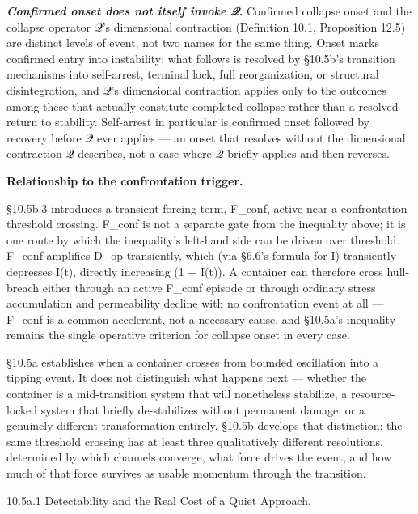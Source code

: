 \documentclass[
]{article}
\begin{document}
\emph{\textbf{Confirmed onset does not itself invoke 𝒬.}} Confirmed
collapse onset and the collapse operator 𝒬's dimensional contraction
(Definition 10.1, Proposition 12.5) are distinct levels of event, not
two names for the same thing. Onset marks confirmed entry into
instability; what follows is resolved by §10.5b's transition mechanisms
into self-arrest, terminal lock, full reorganization, or structural
disintegration, and 𝒬's dimensional contraction applies only to the
outcomes among these that actually constitute completed collapse rather
than a resolved return to stability. Self-arrest in particular is
confirmed onset followed by recovery before 𝒬 ever applies --- an onset
that resolves without the dimensional contraction 𝒬 describes, not a
case where 𝒬 briefly applies and then reverses.

\textbf{Relationship to the confrontation trigger.}

§10.5b.3 introduces a transient forcing term, F\_conf, active near a
confrontation-threshold crossing. F\_conf is not a separate gate from
the inequality above; it is one route by which the inequality's
left-hand side can be driven over threshold. F\_conf amplifies D\_op
transiently, which (via §6.6's formula for I) transiently depresses
I(t), directly increasing (1 − I(t)). A container can therefore cross
hull-breach either through an active F\_conf episode or through ordinary
stress accumulation and permeability decline with no confrontation event
at all --- F\_conf is a common accelerant, not a necessary cause, and
§10.5a's inequality remains the single operative criterion for collapse
onset in every case.

§10.5a establishes when a container crosses from bounded oscillation
into a tipping event. It does not distinguish what happens next ---
whether the container is a mid-transition system that will nonetheless
stabilize, a resource-locked system that briefly de-stabilizes without
permanent damage, or a genuinely different transformation entirely.
§10.5b develops that distinction: the same threshold crossing has at
least three qualitatively different resolutions, determined by which
channels converge, what force drives the event, and how much of that
force survives as usable momentum through the transition.

10.5a.1 Detectability and the Real Cost of a Quiet Approach.
\end{document}
